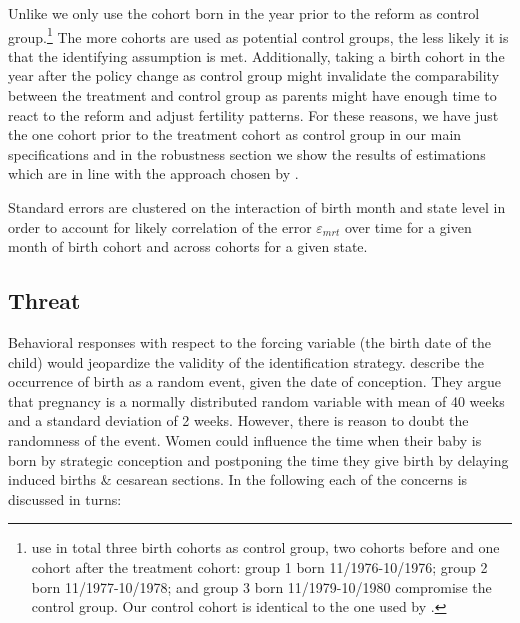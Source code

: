 \documentclass[11pt, a4paper]{article} %
\begin{document}
Unlike \cite{Dustmann2012} we only use the cohort born in the year prior to the reform as control group.\footnote{\cite{Dustmann2012} use in total three birth cohorts as control group, two cohorts before and one cohort after the treatment cohort: group 1 born 11/1976-10/1976; group 2 born 11/1977-10/1978; and group 3 born 11/1979-10/1980 compromise the control group. Our control cohort is identical to the one used by \cite{guertzgen2018}.} The more cohorts are used as potential control groups, the less likely it is that the identifying assumption is met. Additionally, taking a birth cohort in the year after the policy change as control group might invalidate the comparability between the treatment and control group as parents might have enough time to react to the reform and adjust fertility patterns. For these reasons, we have just the one cohort prior to the treatment cohort as control group in our main specifications and in the robustness section we show the results of estimations which are in line with the approach chosen by \cite{Dustmann2012}.\newline


Standard errors are clustered on the interaction of birth month and state level in order to account for likely correlation of the error $\varepsilon_{mrt}$ over time for a given month of birth cohort and across cohorts for a given state.







\newpage
\subsection{Threat}\label{sec:empirical_strategy_2threats}
Behavioral responses with respect to the forcing variable (the birth date of the child) would jeopardize the validity of the identification strategy. \cite{ekberg2013parental} describe the occurrence of birth as a random event, given the date of conception. They argue that pregnancy is a normally distributed random variable with mean of 40 weeks and a standard deviation of 2 weeks. However, there is reason to doubt the randomness of the event. \newline 
Women could influence the time when their baby is born by strategic conception and postponing the time they give birth by delaying induced births \& cesarean sections. In the following each of the concerns is discussed in turns: 
\end{document}
